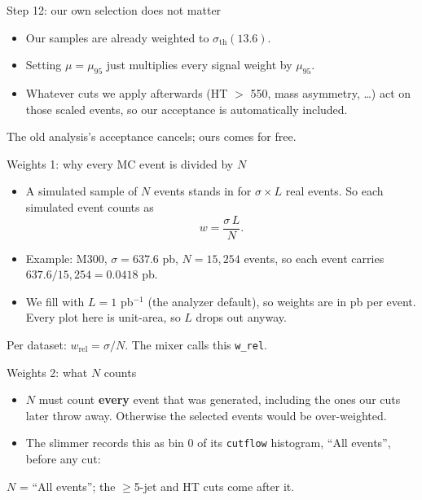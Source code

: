 \documentclass[aspectratio=169,12pt]{beamer}
\newcommand{\codesource}[1]{\par\vspace{0.2em}{\tiny\color{softgray} from #1}\par}
\newcommand{\takeaway}[1]{\vfill
  \colorbox{boxbg}{\parbox{0.96\textwidth}{\centering\vspace{0.3em}#1\vspace{0.3em}}}
  \par\vspace{0.6em}}
\begin{document}
\begin{frame}{Step 12: our own selection does not matter}
  \begin{itemize}
    \item Our samples are already weighted to $\sigma_{\text{th}}(13.6)$.
    \item Setting $\mu = \mu_{95}$ just multiplies every signal weight by
          $\mu_{95}$.
    \item Whatever cuts we apply afterwards (HT $>$ 550, mass asymmetry, \ldots)
          act on those scaled events, so our acceptance is automatically
          included.
  \end{itemize}
  \takeaway{The old analysis's acceptance cancels; ours comes for free.}
\end{frame}


\begin{frame}{Weights 1: why every MC event is divided by $N$}
  \begin{itemize}
    \item A simulated sample of $N$ events stands in for $\sigma \times L$ real
          events. So each simulated event counts as
          \[ w = \frac{\sigma \, L}{N}. \]
    \item Example: M300, $\sigma = 637.6$ pb, $N = 15{,}254$ events, so each
          event carries $637.6 / 15{,}254 = 0.0418$ pb.
    \item We fill with $L = 1$ pb$^{-1}$ (the analyzer default), so weights are in
          pb per event. Every plot here is unit-area, so $L$ drops out anyway.
  \end{itemize}
  \takeaway{Per dataset: $w_{\text{rel}} = \sigma / N$. The mixer calls this
  \texttt{w\_rel}.}
\end{frame}

\begin{frame}{Weights 2: what $N$ counts}
  \begin{itemize}
    \item $N$ must count \textbf{every} event that was generated, including the
          ones our cuts later throw away. Otherwise the selected events would be
          over-weighted.
    \item The slimmer records this as bin 0 of its \texttt{cutflow}
          histogram, ``All events'', before any cut:
  \end{itemize}
  \vspace{0.2em}
  {\lstset{basicstyle=\ttfamily\tiny}\snipsigcutflow}
  \codesource{\srcsigcutflow}
  $N$ = ``All events''; the $\geq$5-jet and HT cuts come after it.
\end{frame}
\end{document}
